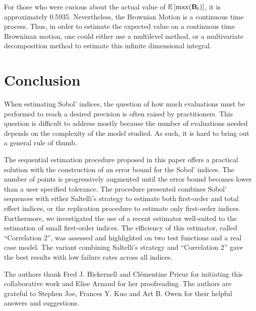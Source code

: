 For those who were curious about the actual value of $\mathbb{E} \left[\max(\boldsymbol{\mathbf{B}}_t)\right]$, it is approximately 0.5935. Nevertheless, the Brownian Motion is a continuous time process. Thus, in order to estimate the expected value on a continuous time Browninan motion, one could either use a multilevel method, or a multivariate decomposition method to estimate this infinite dimensional integral.


\section{Conclusion}
When estimating Sobol' indices, the question of how much evaluations must be performed to reach a desired precision is often raised by practitioners. This question is difficult to address mostly because the number of evaluations needed depends on the complexity of the model studied. As such, it is hard to bring out a general rule of thumb. 

The sequential estimation procedure proposed in this paper offers a practical solution with the construction of an error bound for the Sobol' indices. The number of points is progressively augmented until the error bound becomes lower than a user specified tolerance. The procedure presented combines Sobol' sequences with either Saltelli's strategy to estimate both first-order and total effect indices, or the replication procedure to estimate only first-order indices. Furthermore, we investigated the use of a recent estimator well-suited to the estimation of small first-order indices. The efficiency of this estimator, called ``Correlation 2'', was assessed and highlighted on two test functions and a real case model. The variant combining Saltelli's strategy and ``Correlation 2'' gave the best results with low failure rates across all indices. 

\begin{acknowledgements}
The authors thank Fred J. Hickernell and Cl\'ementine Prieur for initiating this collaborative work and Elise Arnaud for her proofreading. The authors are grateful to Stephen Joe, Frances Y. Kuo and Art B. Owen for their helpful answers and suggestions.   
\end{acknowledgements}



